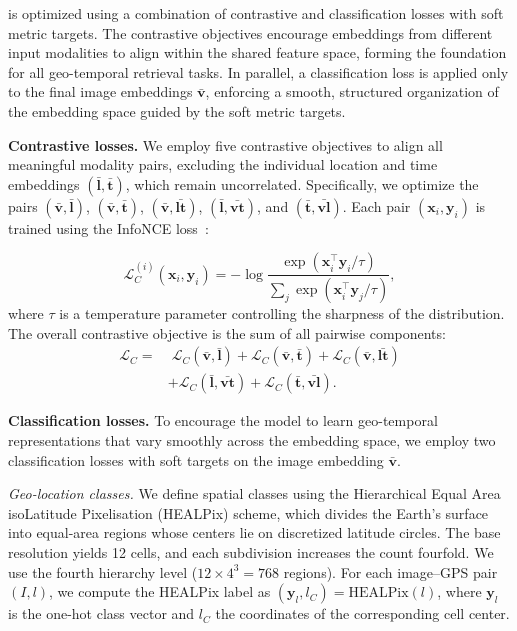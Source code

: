 \tiger is optimized using a combination of contrastive and classification losses with soft metric targets. The contrastive objectives encourage embeddings from different input modalities to align within the shared feature space, forming the foundation for all geo-temporal retrieval tasks. In parallel, a classification loss is applied only to the final image embeddings $\bar{\mathbf{v}}$, enforcing a smooth, structured organization of the embedding space guided by the soft metric targets.

\noindent\textbf{Contrastive losses.}
We employ five contrastive objectives to align all meaningful modality pairs, excluding the individual location and time embeddings $(\bar{\mathbf{l}},\bar{\mathbf{t}})$, which remain uncorrelated. Specifically, we optimize the pairs $(\bar{\mathbf{v}},\bar{\mathbf{l}})$, $(\bar{\mathbf{v}},\bar{\mathbf{t}})$, $(\bar{\mathbf{v}},\bar{\mathbf{lt}})$, $(\bar{\mathbf{l}},\bar{\mathbf{vt}})$, and $(\bar{\mathbf{t}},\bar{\mathbf{vl}})$. Each pair $(\mathbf{x}_i,\mathbf{y}_i)$ is trained using the InfoNCE loss~\cite{oord2018representation}:

\begin{equation}
\mathcal{L}_C^{(i)}(\mathbf{x}_i,\mathbf{y}_i)
= -\log \frac{\exp(\mathbf{x}_i^\top \mathbf{y}_i / \tau)}{\sum_j \exp(\mathbf{x}_i^\top \mathbf{y}_j / \tau)},
\end{equation}
where $\tau$ is a temperature parameter controlling the sharpness of the distribution. The overall contrastive objective is the sum of all pairwise components:
\begin{equation}
\begin{aligned}
\mathcal{L}_C
= &\; \mathcal{L}_C(\bar{\mathbf{v}},\bar{\mathbf{l}})
+ \mathcal{L}_C(\bar{\mathbf{v}},\bar{\mathbf{t}})
+ \mathcal{L}_C(\bar{\mathbf{v}},\bar{\mathbf{lt}}) \\
&+ \mathcal{L}_C(\bar{\mathbf{l}},\bar{\mathbf{vt}})
+ \mathcal{L}_C(\bar{\mathbf{t}},\bar{\mathbf{vl}}).
\end{aligned}
\label{eq:contrastive-losses}
\end{equation}

\noindent\textbf{Classification losses.}
To encourage the model to learn geo-temporal representations that vary smoothly across the embedding space, we employ two classification losses with soft targets on the image embedding $\bar{\mathbf{v}}$.

\textit{Geo-location classes.}  
We define spatial classes using the Hierarchical Equal Area isoLatitude Pixelisation (HEALPix) \cite{gorski2005healpix} scheme, which divides the Earth's surface into equal-area regions whose centers lie on discretized latitude circles. The base resolution yields 12 cells, and each subdivision increases the count fourfold. We use the fourth hierarchy level ($12\times4^3=768$ regions). For each image–GPS pair $(I,l)$, we compute the HEALPix label as $(\mathbf{y}_l,l_C)=\mathrm{HEALPix}(l)$, where $\mathbf{y}_l$ is the one-hot class vector and $l_C$ the coordinates of the corresponding cell center.

